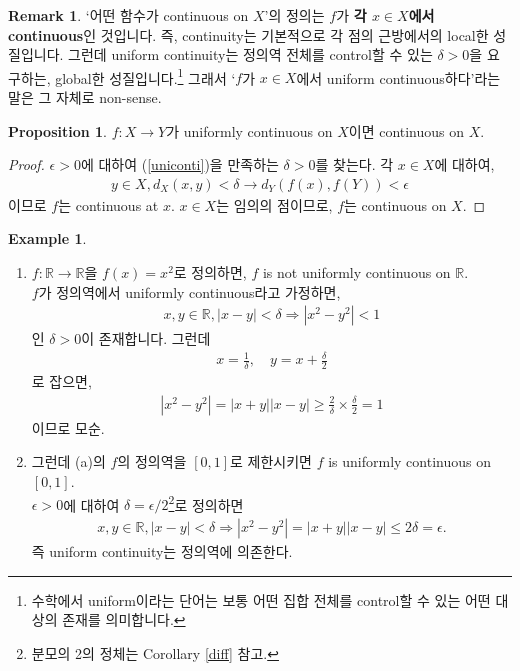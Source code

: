 \documentclass[12pt]{article}
\theoremstyle{definition}
\newtheorem{prop}[thm]{Proposition}
\newtheorem*{rem}{Remark}
\newtheorem*{ex}{Example}
\def\RR{\mathbb{R}}
\def\eps{\epsilon}
\newcommand{\abs}[1]{\left\vert#1\right\vert}
\begin{document}
\begin{rem}
	`어떤 함수가 continuous on \(X\)'의 정의는 \(f\)가 \textbf{각 \(x \in X\)에서 continuous}인 것입니다. 즉, continuity는 기본적으로 각 점의 근방에서의 local한 성질입니다. 그런데 uniform continuity는 정의역 전체를 control할 수 있는 \(\delta > 0\)을 요구하는, global한 성질입니다.\footnote{수학에서 uniform이라는 단어는 보통 어떤 집합 전체를 control할 수 있는 어떤 대상의 존재를 의미합니다.} 그래서 `\(f\)가 \(x \in X\)에서 uniform continuous하다'라는 말은 그 자체로 non-sense.
\end{rem}

\begin{prop}
	\(f: X \rightarrow Y\)가 uniformly continuous on \(X\)이면 continuous on \(X\).
\end{prop}
\begin{proof}
	\(\eps > 0\)에 대하여 (\ref{uniconti})을 만족하는 \(\delta > 0\)를 찾는다. 각 \(x \in X\)에 대하여,
	\begin{gather*}
		y \in X, d_X (x, y) < \delta \rightarrow d_Y (f(x), f(Y)) < \eps
	\end{gather*}
	이므로 \(f\)는 continuous at \(x\). \(x \in X\)는 임의의 점이므로, \(f\)는 continuous on \(X\).
\end{proof}

\begin{ex}
	\quad
	\begin{enumerate} [label=(\alph*), leftmargin=2\parindent]
		\item
		\(f:\RR \rightarrow \RR\)을 \(f(x) = x^2\)로 정의하면, \(f\) is not uniformly continuous on \(\RR\).\\
		\(f\)가 정의역에서 uniformly continuous라고 가정하면,
		\begin{gather*}
			x, y \in \RR, \abs{x - y} < \delta \Longrightarrow \abs{x^2 - y^2} < 1
		\end{gather*}
		인 \(\delta > 0\)이 존재합니다. 그런데
		\begin{gather*}
			x = \frac{1}{\delta}, \quad y = x + \frac{\delta}{2}
		\end{gather*}
		로 잡으면,
		\begin{gather*}
			\abs{x^2 - y^2} = \abs{x + y}\abs{x - y} \ge \frac{2}{\delta}\times \frac{\delta}{2} = 1
		\end{gather*}
		이므로 모순.
		\item
		그런데 (a)의 \(f\)의 정의역을 \([0, 1]\)로 제한시키면 \(f\) is uniformly continuous on \([0, 1]\).\\
		\(\eps > 0\)에 대하여 \(\delta = \eps / 2\)\footnote{분모의 2의 정체는 Corollary \ref{diff} 참고.}로 정의하면
		\begin{gather*}
			x, y \in \RR, \abs{x - y} < \delta \Longrightarrow \abs{x^2 - y^2} = \abs{x + y}\abs{x - y} \le 2\delta = \eps.
		\end{gather*}
		즉 uniform continuity는 정의역에 의존한다.
	\end{enumerate}
\end{ex}
\end{document}
